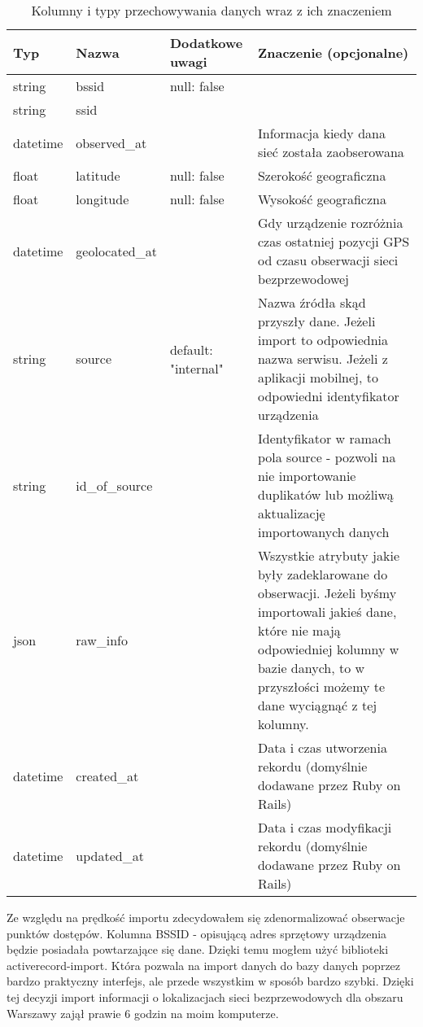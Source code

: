 \begin{table}
\caption{Kolumny i typy przechowywania danych wraz z ich znaczeniem}
\label{table:dbscheme}
\begin{tabular} { |l|l|l|p{6cm}|  }
\hline
Typ & Nazwa & Dodatkowe uwagi & Znaczenie (opcjonalne) \\
\hline
\hline
string   & bssid & null: false & \\
\hline
string   & ssid & & \\
\hline
datetime & observed\_at & & Informacja kiedy dana sieć została zaobserowana \\
\hline
float    & latitude & null: false & Szerokość geograficzna \\
\hline
float    & longitude & null: false & Wysokość geograficzna \\
\hline
datetime & geolocated\_at & & Gdy urządzenie rozróżnia czas ostatniej pozycji GPS od czasu obserwacji sieci bezprzewodowej \\
\hline
string   & source & default: "internal" & Nazwa źródła skąd przyszły dane. Jeżeli import to odpowiednia nazwa serwisu. Jeżeli z aplikacji mobilnej, to odpowiedni identyfikator urządzenia \\
\hline
string   & id\_of\_source & & Identyfikator w ramach pola source - pozwoli na nie importowanie duplikatów lub możliwą aktualizację importowanych danych \\
\hline
json     & raw\_info & & Wszystkie atrybuty jakie były zadeklarowane do obserwacji. Jeżeli byśmy importowali jakieś dane, które nie mają odpowiedniej kolumny w bazie danych, to w przyszłości możemy te dane wyciągnąć z tej kolumny. \\
\hline
datetime & created\_at & & Data i czas utworzenia rekordu (domyślnie dodawane przez Ruby on Rails) \\
\hline
datetime & updated\_at & & Data i czas modyfikacji rekordu (domyślnie dodawane przez Ruby on Rails) \\
\hline
\end{tabular}
\end{table}

Ze względu na prędkość importu zdecydowałem się zdenormalizować obserwacje punktów dostępów. Kolumna BSSID - opisującą adres sprzętowy urządzenia będzie posiadała powtarzające się dane. Dzięki temu mogłem użyć biblioteki activerecord-import. Która pozwala na import danych do bazy danych poprzez bardzo praktyczny interfejs, ale przede wszystkim w sposób bardzo szybki. Dzięki tej decyzji import informacji o lokalizacjach sieci bezprzewodowych dla obszaru Warszawy zajął prawie 6 godzin na moim komputerze.


